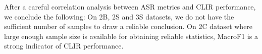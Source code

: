 \begin{comment}

\begin{table}[ht]
    \centering
    \begin{tabular}{cccccccccc}
Lang & N & Correlation & WER & MER & WIL & WIP & \bleu lc & \maf1 lc & \mif1 lc \\ \hline \hline
2C & 21 & Pearson & -0.709 | 0.00 & -0.679 | 0.00 & -0.707 | 0.00 & 0.707 | 0.00 & 0.642 | 0.00 & 0.705 | 0.00 & 0.796 | 0.00 \\
2B & 7 & Pearson & -0.584 | 0.17 & -0.567 | 0.18 & -0.544 | 0.21 & 0.544 | 0.21 & 0.593 | 0.16 & 0.502 | 0.25 & 0.386 | 0.39 \\
2S & 7 & Pearson & -0.529 | 0.22 & -0.527 | 0.22 & -0.527 | 0.22 & 0.527 | 0.22 & 0.514 | 0.24 & 0.529 | 0.22 & 0.543 | 0.21 \\
3S & 8 & Pearson & -0.987 | 0.00 & -0.988 | 0.00 & -0.985 | 0.00 & 0.985 | 0.00 & 0.987 | 0.00 & 0.990 | 0.00 & 0.975 | 0.00 \\ \hline 
\end{tabular} 
    \caption{Pearson correlation coefficient and p-values (separated by | )  between ASR metrics and mAQWV. }
    \label{tab:asr-aqwv-pearson}
\end{table}



\begin{table}[ht]
    \footnotesize
    \centering
    \begin{tabular}{cccccccccc}
Lang & N & Correlation & WER & MER & WIL & WIP & BLEU lc & MicroF1 lc & MacroF1 lc \\
2C & 21 & Kendall & -0.524 | 0.00 & -0.524 | 0.00 & -0.524 | 0.00 & 0.524 | 0.00 & 0.505 | 0.00 & 0.530 | 0.00 & 0.578 | 0.00 \\
2B & 7 & Kendall & -0.143 | 0.77 & -0.143 | 0.77 & -0.238 | 0.56 & 0.238 | 0.56 & 0.293 | 0.36 & 0.195 | 0.54 & 0.238 | 0.56 \\
2S & 7 & Kendall & -0.524 | 0.14 & -0.524 | 0.14 & -0.524 | 0.14 & 0.524 | 0.14 & 0.488 | 0.13 & 0.524 | 0.14 & 0.586 | 0.07 \\
3S & 8 & Kendall & -0.857 | 0.00 & -0.857 | 0.00 & -0.857 | 0.00 & 0.857 | 0.00 & 0.857 | 0.00 & 0.857 | 0.00 & 0.857 | 0.00 \\
\end{tabular} 
    \caption{Kendall’s rank correlation coefficient and p-values (separated by | )  between ASR metrics and mAQWV. }
    \label{tab:asr-aqwv-kendall}
\end{table}
\end{comment}

After a careful correlation analysis between ASR metrics and CLIR performance, we conclude the following:
On 2B, 2S and 3S datasets, we do not have the sufficient number of samples to draw a reliable conclusion. 
On 2C dataset where large enough sample size is available for obtaining reliable statistics, MacroF1 is a strong indicator of CLIR performance.

